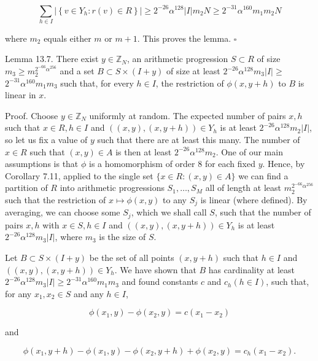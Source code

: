 \documentclass[10pt]{article}
\begin{document}
$$
\sum_{h \in I}\left|\left\{v \in Y_{h}: r(v) \in R\right\}\right| \geqslant 2^{-26} \alpha^{128}|I| m_{2} N \geqslant 2^{-31} \alpha^{160} m_{1} m_{2} N
$$

where $m_{2}$ equals either $m$ or $m+1$. This proves the lemma. \(\square\)

Lemma 13.7. There exist $y \in \mathbb{Z}_{N}$, an arithmetic progression $S \subset R$ of size $m_{3} \geqslant m_{2}^{2^{-66}\alpha^{256}}$ and a set $B \subset S \times(I+y)$ of size at least $2^{-26} \alpha^{128} m_{3}|I| \geqslant$ $2^{-31} \alpha^{160} m_{1} m_{3}$ such that, for every $h \in I$, the restriction of $\phi(x, y+h)$ to $B$ is linear in $x$.

Proof. Choose $y \in \mathbb{Z}_{N}$ uniformly at random. The expected number of pairs $x, h$ such that $x \in R, h \in I$ and $((x, y),(x, y+h)) \in Y_{h}$ is at least $2^{-26} \alpha^{128} m_{2}|I|$, so let us fix a value of $y$ such that there are at least this many. The number of $x \in R$ such that $(x, y) \in A$ is then at least $2^{-26} \alpha^{128} m_{2}$. One of our main assumptions is that $\phi$ is a homomorphism of order 8 for each fixed $y$. Hence, by Corollary 7.11, applied to the single set $\{x \in R:(x, y) \in A\}$ we can find a partition of $R$ into arithmetic progressions $S_{1}, \ldots, S_{M}$ all of length at least $m_{2}^{2^{-66}\alpha^{256}}$ such that the restriction of $x \mapsto \phi(x, y)$ to any $S_{j}$ is linear (where defined). By averaging, we can choose some $S_{j}$, which we shall call $S$, such that the number of pairs $x, h$ with $x \in S, h \in I$ and $((x, y),(x, y+h)) \in Y_{h}$ is at least $2^{-26} \alpha^{128} m_{3}|I|$, where $m_{3}$ is the size of $S$.

Let $B \subset S \times(I+y)$ be the set of all points $(x, y+h)$ such that $h \in I$ and $((x, y),(x, y+h)) \in Y_{h}$. We have shown that $B$ has cardinality at least $2^{-26} \alpha^{128} m_{3}|I| \geqslant 2^{-31} \alpha^{160} m_{1} m_{3}$ and found constants $c$ and $c_{h}(h \in I)$, such that, for any $x_{1}, x_{2} \in S$ and any $h \in I$,

$$
\phi\left(x_{1}, y\right)-\phi\left(x_{2}, y\right)=c\left(x_{1}-x_{2}\right)
$$

and

$$
\phi\left(x_{1}, y+h\right)-\phi\left(x_{1}, y\right)-\phi\left(x_{2}, y+h\right)+\phi\left(x_{2}, y\right)=c_{h}\left(x_{1}-x_{2}\right) .
$$
\end{document}

